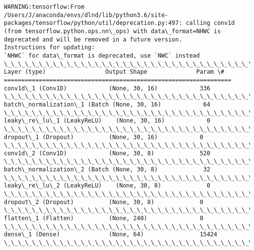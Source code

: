 \documentclass[11pt]{article}
\begin{document}
    \begin{Verbatim}[commandchars=\\\{\}]
WARNING:tensorflow:From /Users/J/anaconda/envs/dlnd/lib/python3.6/site-packages/tensorflow/python/util/deprecation.py:497: calling conv1d (from tensorflow.python.ops.nn\_ops) with data\_format=NHWC is deprecated and will be removed in a future version.
Instructions for updating:
`NHWC` for data\_format is deprecated, use `NWC` instead
\_\_\_\_\_\_\_\_\_\_\_\_\_\_\_\_\_\_\_\_\_\_\_\_\_\_\_\_\_\_\_\_\_\_\_\_\_\_\_\_\_\_\_\_\_\_\_\_\_\_\_\_\_\_\_\_\_\_\_\_\_\_\_\_\_
Layer (type)                 Output Shape              Param \#   
=================================================================
conv1d\_1 (Conv1D)            (None, 30, 16)            336       
\_\_\_\_\_\_\_\_\_\_\_\_\_\_\_\_\_\_\_\_\_\_\_\_\_\_\_\_\_\_\_\_\_\_\_\_\_\_\_\_\_\_\_\_\_\_\_\_\_\_\_\_\_\_\_\_\_\_\_\_\_\_\_\_\_
batch\_normalization\_1 (Batch (None, 30, 16)            64        
\_\_\_\_\_\_\_\_\_\_\_\_\_\_\_\_\_\_\_\_\_\_\_\_\_\_\_\_\_\_\_\_\_\_\_\_\_\_\_\_\_\_\_\_\_\_\_\_\_\_\_\_\_\_\_\_\_\_\_\_\_\_\_\_\_
leaky\_re\_lu\_1 (LeakyReLU)    (None, 30, 16)            0         
\_\_\_\_\_\_\_\_\_\_\_\_\_\_\_\_\_\_\_\_\_\_\_\_\_\_\_\_\_\_\_\_\_\_\_\_\_\_\_\_\_\_\_\_\_\_\_\_\_\_\_\_\_\_\_\_\_\_\_\_\_\_\_\_\_
dropout\_1 (Dropout)          (None, 30, 16)            0         
\_\_\_\_\_\_\_\_\_\_\_\_\_\_\_\_\_\_\_\_\_\_\_\_\_\_\_\_\_\_\_\_\_\_\_\_\_\_\_\_\_\_\_\_\_\_\_\_\_\_\_\_\_\_\_\_\_\_\_\_\_\_\_\_\_
conv1d\_2 (Conv1D)            (None, 30, 8)             520       
\_\_\_\_\_\_\_\_\_\_\_\_\_\_\_\_\_\_\_\_\_\_\_\_\_\_\_\_\_\_\_\_\_\_\_\_\_\_\_\_\_\_\_\_\_\_\_\_\_\_\_\_\_\_\_\_\_\_\_\_\_\_\_\_\_
batch\_normalization\_2 (Batch (None, 30, 8)             32        
\_\_\_\_\_\_\_\_\_\_\_\_\_\_\_\_\_\_\_\_\_\_\_\_\_\_\_\_\_\_\_\_\_\_\_\_\_\_\_\_\_\_\_\_\_\_\_\_\_\_\_\_\_\_\_\_\_\_\_\_\_\_\_\_\_
leaky\_re\_lu\_2 (LeakyReLU)    (None, 30, 8)             0         
\_\_\_\_\_\_\_\_\_\_\_\_\_\_\_\_\_\_\_\_\_\_\_\_\_\_\_\_\_\_\_\_\_\_\_\_\_\_\_\_\_\_\_\_\_\_\_\_\_\_\_\_\_\_\_\_\_\_\_\_\_\_\_\_\_
dropout\_2 (Dropout)          (None, 30, 8)             0         
\_\_\_\_\_\_\_\_\_\_\_\_\_\_\_\_\_\_\_\_\_\_\_\_\_\_\_\_\_\_\_\_\_\_\_\_\_\_\_\_\_\_\_\_\_\_\_\_\_\_\_\_\_\_\_\_\_\_\_\_\_\_\_\_\_
flatten\_1 (Flatten)          (None, 240)               0         
\_\_\_\_\_\_\_\_\_\_\_\_\_\_\_\_\_\_\_\_\_\_\_\_\_\_\_\_\_\_\_\_\_\_\_\_\_\_\_\_\_\_\_\_\_\_\_\_\_\_\_\_\_\_\_\_\_\_\_\_\_\_\_\_\_
dense\_1 (Dense)              (None, 64)                15424     
\_\_\_\_\_\_\_\_\_\_\_\_\_\_\_\_\_\_\_\_\_\_\_\_\_\_\_\_\_\_\_\_\_\_\_\_\_\_\_\_\_\_\_\_\_\_\_\_\_\_\_\_\_\_\_\_\_\_\_\_\_\_\_\_\_

\end{Verbatim}
\end{document}
